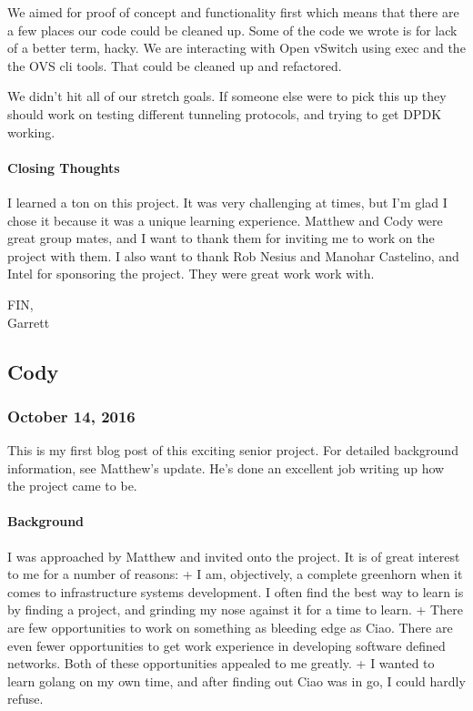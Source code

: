 \documentclass[10pt,onecolumn,journal,draftclsnofoot]{IEEEtran}
\begin{document}
We aimed for proof of concept and functionality first which means that
there are a few places our code could be cleaned up. Some of the code we
wrote is for lack of a better term, hacky. We are interacting with Open
vSwitch using exec and the the OVS cli tools. That could be cleaned up
and refactored.

We didn't hit all of our stretch goals. If someone else were to pick
this up they should work on testing different tunneling protocols, and
trying to get DPDK working.

\paragraph{Closing Thoughts} 

I learned a ton on this project. It was very challenging at times, but
I'm glad I chose it because it was a unique learning experience. Matthew
and Cody were great group mates, and I want to thank them for inviting
me to work on the project with them. I also want to thank Rob Nesius and
Manohar Castelino, and Intel for sponsoring the project. They were great
work work with.

FIN,\\
Garrett

\subsection{Cody}
\subsubsection{October 14, 2016} 

This is my first blog post of this exciting senior project. For detailed
background information, see Matthew's update. He's done an excellent job
writing up how the project came to be.

\paragraph{Background}

I was approached by Matthew and invited onto the project. It is of great
interest to me for a number of reasons: + I am, objectively, a complete
greenhorn when it comes to infrastructure systems development. I often
find the best way to learn is by finding a project, and grinding my nose
against it for a time to learn. + There are few opportunities to work on
something as bleeding edge as Ciao. There are even fewer opportunities
to get work experience in developing software defined networks. Both of
these opportunities appealed to me greatly. + I wanted to learn golang
on my own time, and after finding out Ciao was in go, I could hardly
refuse.
\end{document}
